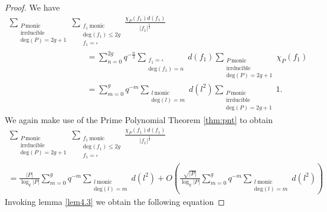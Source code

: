 \documentclass[11pt]{amsart}
\begin{document}
\begin{proof}
We have
\begin{multline}
\sum_{\substack{P \ \mathrm{monic} \\ \mathrm{irrducible} \\ \mathrm{deg}(P)=2g+1}}\sum_{\substack{f_{1} \ \mathrm{monic} \\ \mathrm{deg}(f_{1})\leq2g \\ f_{1}=\square}}\frac{\chi_{P}(f_{1})d(f_{1})}{|f_{1}|^{\tfrac{1}{2}}}\nonumber\\
\ \ \ \ \ \ \ \ \ \ \ \ \ \ \ \ \ \ \ \ \ \ \ \ \ \ \ \ \ \ \ \ \ \ \ \ \ \ \ \ \ \ \ =\sum_{n=0}^{2g}q^{-\tfrac{n}{2}}\sum_{\substack{f_{1}=\square \\ \mathrm{deg}(f_{1})=n}}d(f_{1})\sum_{\substack{P \ \mathrm{monic} \\ \mathrm{irrducible} \\ \mathrm{deg}(P)=2g+1}}\chi_{P}(f_{1})\ \ \ \ \ \ \ \ \ \ \ \ \ \ \ \ \ \ \ \ \ \ \ \ \ \ \ \ \ \ \ \ \ \ \ \ \ \ \ \ \ \ \ \ \ \ \ \ \ \ \ \ \\
\ \ \ \ \ \ \ \ \ \ \ \ \ \ \ \ \ \ \ \ \ \ \ \ \ \ \ \ \ \ \ \ \ \ \ \ \ \ \ \ \ \ \ =\sum_{m=0}^{g}q^{-m}\sum_{\substack{l \ \mathrm{monic} \\ \mathrm{deg}(l)=m}}d(l^{2})\sum_{\substack{P \ \mathrm{monic} \\ \mathrm{irrducible} \\ \mathrm{deg}(P)=2g+1}}1.\ \ \ \ \ \ \ \ \ \ \ \ \ \ \ \ \ \ \ \ \ \ \ \ \ \ \ \ \ \ \ \ \ \ \ \ \ \ \ \ \ \ \ \ \ \ \ \ \ \ \ \ 
\end{multline}
We again make use of the Prime Polynomial Theorem \ref{thm:pnt} to obtain
\begin{multline}
\sum_{\substack{P \ \mathrm{monic} \\ \mathrm{irrducible} \\ \mathrm{deg}(P)=2g+1}}\sum_{\substack{f_{1} \ \mathrm{monic} \\ \mathrm{deg}(f_{1})\leq2g \\ f_{1}=\square}}\frac{\chi_{P}(f_{1})d(f_{1})}{|f_{1}|^{\tfrac{1}{2}}}\nonumber\\
=\frac{|P|}{\log_{q}|P|}\sum_{m=0}^{g}q^{-m}\sum_{\substack{l \ \mathrm{monic} \\ \mathrm{deg}(l)=m}}d(l^{2})+O\left(\frac{\sqrt{|P|}}{\log_{q}|P|}\sum_{m=0}^{g}q^{-m}\sum_{\substack{l \ \mathrm{monic} \\ \mathrm{deg}(l)=m}}d(l^{2})\right)
\end{multline}
Invoking lemma \ref{lem4.3} we obtain the following equation

\end{proof}
\end{document}
